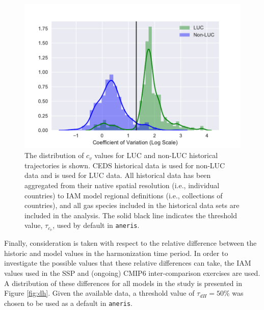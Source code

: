 \documentclass[review]{elsarticle}
\newcommand{\code}[1]{\lstinline[basicstyle=\ttfamily\color{black}]|#1|}
\begin{document}
\begin{figure}
  \begin{center}
    \includegraphics[width=\textwidth]{cov.pdf}
    \caption[]{
      \label{fig:cov}
      The distribution of $c_v$ values for LUC and non-LUC historical
      trajectories is shown. CEDS historical data \cite{hoesly_historical_2017}
      is used for non-LUC data and \cite{van_marle_historic_2017} is used for
      LUC data. All historical data has been aggregated from their native
      spatial resolution (i.e., individual countries) to IAM model regional
      definitions (i.e., collections of countries), and all gas species included
      in the historical data sets are included in the analysis. The solid black
      line indicates the threshold value, $\tau_{c_v}$, used by default in
      \code{aneris}.  }
  \end{center}
\end{figure}

Finally, consideration is taken with respect to the relative difference between
the historic and model values in the harmonization time period. In order to
investigate the possible values that these relative differences can take, the
IAM values used in the SSP and (ongoing) CMIP6 inter-comparison
exercises are used. A distribution of these differences for all models in the
study is presented in Figure \ref{fig:dh}. Given the available data, a threshold
value of $\tau_{dH} = 50$\% was chosen to be used as a default in \code{aneris}.
\end{document}
